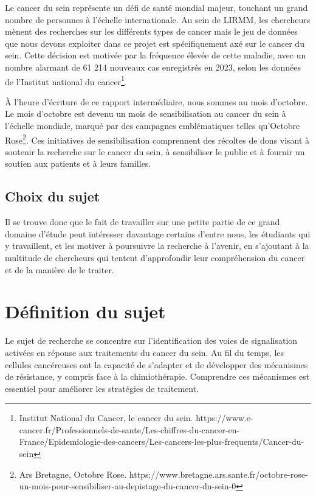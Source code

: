 \documentclass[mstat,12pt]{unswthesis}
\begin{document}
\bigskip

Le cancer du sein représente un défi de santé mondial majeur, touchant
un grand nombre de personnes à l'échelle internationale. Au sein de
LIRMM, les chercheurs mènent des recherches sur les différents types de
cancer mais le jeu de données que nous devons exploiter dans ce projet
est spécifiquement axé sur le cancer du sein. Cette décision est motivée
par la fréquence élevée de cette maladie, avec un nombre alarmant de 61
214 nouveaux cas enregistrés en 2023, selon les données de l'Institut
national du
cancer\footnote{ Institut National du Cancer, le cancer du sein. https://www.e-cancer.fr/Professionnels-de-sante/Les-chiffres-du-cancer-en-France/Epidemiologie-des-cancers/Les-cancers-les-plus-frequents/Cancer-du-sein}.

\bigskip

À l'heure d'écriture de ce rapport intermédiaire, nous sommes au mois
d'octobre. Le mois d'octobre est devenu un mois de sensibilisation au
cancer du sein à l'échelle mondiale, marqué par des campagnes
emblématiques telles qu'Octobre
Rose\footnote{ Ars Bretagne, Octobre Rose. https://www.bretagne.ars.sante.fr/octobre-rose-un-mois-pour-sensibiliser-au-depistage-du-cancer-du-sein-0}.
Ces initiatives de sensibilisation comprennent des récoltes de dons
visant à soutenir la recherche sur le cancer du sein, à sensibiliser le
public et à fournir un soutien aux patients et à leurs familles.

\hypertarget{choix-du-sujet}{%
\section{Choix du sujet}\label{choix-du-sujet}}

Il se trouve donc que le fait de travailler sur une petite partie de ce
grand domaine d'étude peut intéresser davantage certains d'entre nous,
les étudiants qui y travaillent, et les motiver à poursuivre la
recherche à l'avenir, en s'ajoutant à la multitude de chercheurs qui
tentent d'approfondir leur compréhension du cancer et de la manière de
le traiter.

\hypertarget{duxe9finition-du-sujet}{%
\chapter{Définition du sujet}\label{duxe9finition-du-sujet}}

Le sujet de recherche se concentre sur l'identification des voies de
signalisation activées en réponse aux traitements du cancer du sein. Au
fil du temps, les cellules cancéreuses ont la capacité de s'adapter et
de développer des mécanismes de résistance, y compris face à la
chimiothérapie. Comprendre ces mécanismes est essentiel pour améliorer
les stratégies de traitement.
\end{document}
